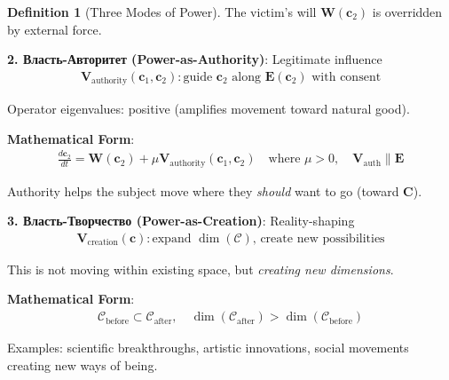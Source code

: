\documentclass[11pt,a4paper]{article}
\theoremstyle{definition}
\newtheorem{definition}{Definition}[section]
\theoremstyle{remark}
\newcommand{\CC}{\mathcal{C}}
\newcommand{\EE}{\mathbf{E}}
\newcommand{\WW}{\mathbf{W}}
\newcommand{\VV}{\mathbf{V}}
\newcommand{\cc}{\mathbf{c}}
\begin{document}
\begin{enumerate}
\begin{definition}[Three Modes of Power]
The victim's will \(\WW(\cc_2)\) is overridden by external force.

\textbf{2. Власть-Авторитет (Power-as-Authority)}: Legitimate influence
\begin{align}
\VV_{\text{authority}}(\cc_1, \cc_2): \text{guide } \cc_2 \text{ along } \EE(\cc_2) \text{ with consent}
\end{align}

Operator eigenvalues: positive (amplifies movement toward natural good).

\textbf{Mathematical Form}:
\begin{align}
\frac{d\cc_2}{dt} = \WW(\cc_2) + \mu \VV_{\text{authority}}(\cc_1, \cc_2) \quad \text{where } \mu > 0, \quad \VV_{\text{auth}} \parallel \EE
\end{align}

Authority helps the subject move where they \textit{should} want to go (toward \(\mathbf{C}\)).

\textbf{3. Власть-Творчество (Power-as-Creation)}: Reality-shaping
\begin{align}
\VV_{\text{creation}}(\cc): \text{expand } \dim(\CC) \text{, create new possibilities}
\end{align}

This is not moving within existing space, but \textit{creating new dimensions}.

\textbf{Mathematical Form}:
\begin{align}
\CC_{\text{before}} \subset \CC_{\text{after}}, \quad \dim(\CC_{\text{after}}) > \dim(\CC_{\text{before}})
\end{align}

Examples: scientific breakthroughs, artistic innovations, social movements creating new ways of being.
\end{definition}

\begin{figure}[H]
\centering
{}
\end{figure}
\end{enumerate}
\end{document}
